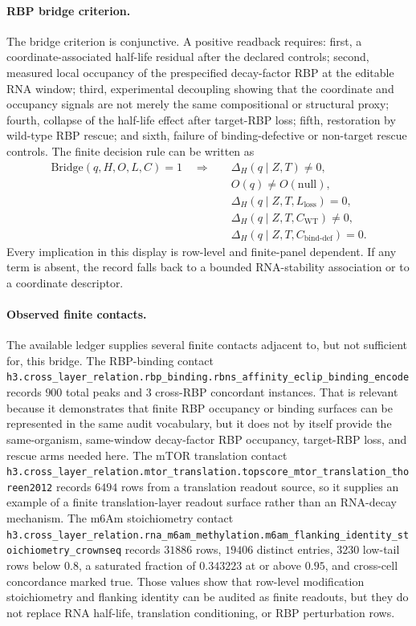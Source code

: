 \paragraph{RBP bridge criterion.}
The bridge criterion is conjunctive. A positive readback requires: first, a coordinate-associated half-life residual after the declared controls; second, measured local occupancy of the prespecified decay-factor RBP at the editable RNA window; third, experimental decoupling showing that the coordinate and occupancy signals are not merely the same compositional or structural proxy; fourth, collapse of the half-life effect after target-RBP loss; fifth, restoration by wild-type RBP rescue; and sixth, failure of binding-defective or non-target rescue controls. The finite decision rule can be written as
$$
\begin{aligned}
\mathrm{Bridge}(q,H,O,L,C) = 1
\quad\Longrightarrow\quad
&\Delta_H(q\mid Z,T)\neq 0,\\
&O(q)\neq O(\mathrm{null}),\\
&\Delta_H(q\mid Z,T,L_{\mathrm{loss}})=0,\\
&\Delta_H(q\mid Z,T,C_{\mathrm{WT}})\neq 0,\\
&\Delta_H(q\mid Z,T,C_{\mathrm{bind\mbox{-}def}})=0.
\end{aligned}
$$
Every implication in this display is row-level and finite-panel dependent. If any term is absent, the record falls back to a bounded RNA-stability association or to a coordinate descriptor.

\paragraph{Observed finite contacts.}
The available ledger supplies several finite contacts adjacent to, but not sufficient for, this bridge. The RBP-binding contact \texttt{h3.cross\_layer\_relation.rbp\_binding.rbns\_affinity\_eclip\_binding\_encode} records $900$ total peaks and $3$ cross-RBP concordant instances. That is relevant because it demonstrates that finite RBP occupancy or binding surfaces can be represented in the same audit vocabulary, but it does not by itself provide the same-organism, same-window decay-factor RBP occupancy, target-RBP loss, and rescue arms needed here. The mTOR translation contact \texttt{h3.cross\_layer\_relation.mtor\_translation.topscore\_mtor\_translation\_thoreen2012} records $6494$ rows from a translation readout source, so it supplies an example of a finite translation-layer readout surface rather than an RNA-decay mechanism. The m6Am stoichiometry contact \texttt{h3.cross\_layer\_relation.rna\_m6am\_methylation.m6am\_flanking\_identity\_stoichiometry\_crownseq} records $31886$ rows, $19406$ distinct entries, $3230$ low-tail rows below $0.8$, a saturated fraction of $0.343223$ at or above $0.95$, and cross-cell concordance marked true. Those values show that row-level modification stoichiometry and flanking identity can be audited as finite readouts, but they do not replace RNA half-life, translation conditioning, or RBP perturbation rows.

